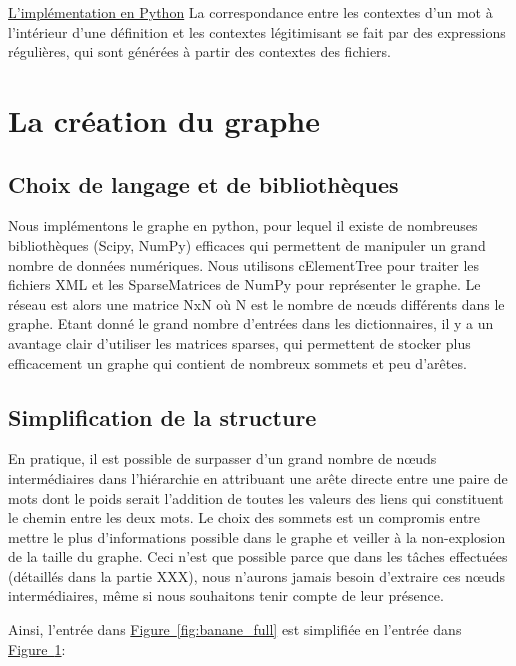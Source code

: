 \documentclass[a4paper, 12pt]{article}
\begin{document}
\underline{L'implémentation en Python}\newline
La correspondance entre les contextes d'un mot à l'intérieur d'une définition et 
les contextes légitimisant se fait par des expressions régulières, qui sont 
générées à partir des contextes des fichiers.

\section{La création du graphe}

\subsection{Choix de langage et de bibliothèques}
Nous implémentons le graphe en python, pour lequel il existe de nombreuses 
bibliothèques (Scipy, NumPy) efficaces qui permettent de manipuler un grand 
nombre de données numériques. Nous utilisons cElementTree pour traiter les 
fichiers XML et les SparseMatrices de NumPy pour représenter le graphe. Le 
réseau est alors une matrice NxN où N est le nombre de nœuds différents dans le 
graphe. Etant donné le grand nombre d'entrées dans les dictionnaires, il y a un 
avantage clair d'utiliser les matrices sparses, qui permettent de stocker plus 
efficacement un graphe qui contient de nombreux sommets et peu d'arêtes.

\subsection{Simplification de la structure}
En pratique, il est possible de surpasser d'un grand nombre de nœuds 
intermédiaires dans l'hiérarchie en attribuant une arête directe entre une paire 
de mots dont le poids serait l'addition de toutes les valeurs des liens qui 
constituent le chemin entre les deux mots. Le choix des sommets est un compromis 
entre mettre le plus d'informations possible dans le graphe et veiller à la 
non-explosion de la taille du graphe. Ceci n'est que possible parce que dans les 
tâches effectuées (détaillés dans la partie XXX), nous n'aurons jamais besoin 
d'extraire ces nœuds intermédiaires, même si nous souhaitons tenir compte de 
leur présence.

Ainsi, l'entrée dans \hyperref[fig:banane_full]{Figure~\ref*{fig:banane_full}} 
est simplifiée en l'entrée dans 
\hyperref[fig:banane_simple]{Figure~\ref*{fig:banane_simple}}:

\begin{figure}
\centering
\parbox{5cm}{
\def\svgscale{0.5}

\caption{}
\label{fig:banane_full}}
\qquad
\begin{minipage}{5cm}
\def\svgscale{0.5}

\caption{}
\label{fig:banane_simple}
\end{minipage}
\end{figure}
\end{document}
